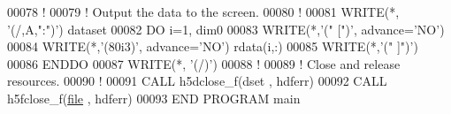 \begin{DoxyCode}
00078   \textcolor{comment}{!}
00079   \textcolor{comment}{! Output the data to the screen.}
00080   \textcolor{comment}{!}
00081   \textcolor{keyword}{WRITE}(*, \textcolor{stringliteral}{'(/,A,":")'}) dataset
00082   \textcolor{keywordflow}{DO} i=1, dim0
00083      \textcolor{keyword}{WRITE}(*,\textcolor{stringliteral}{'(" [")'}, advance=\textcolor{stringliteral}{'NO'})
00084      \textcolor{keyword}{WRITE}(*,\textcolor{stringliteral}{'(80i3)'}, advance=\textcolor{stringliteral}{'NO'}) rdata(i,:)
00085      \textcolor{keyword}{WRITE}(*,\textcolor{stringliteral}{'(" ]")'})
00086 \textcolor{keywordflow}{  ENDDO}
00087   \textcolor{keyword}{WRITE}(*, \textcolor{stringliteral}{'(/)'})
00088   \textcolor{comment}{!}
00089   \textcolor{comment}{! Close and release resources.}
00090   \textcolor{comment}{!}
00091   \textcolor{keyword}{CALL }h5dclose\_f(dset , hdferr)
00092   \textcolor{keyword}{CALL }h5fclose\_f(\hyperlink{structfile}{file} , hdferr)
00093 \textcolor{keyword}{END PROGRAM }main
\end{DoxyCode}
